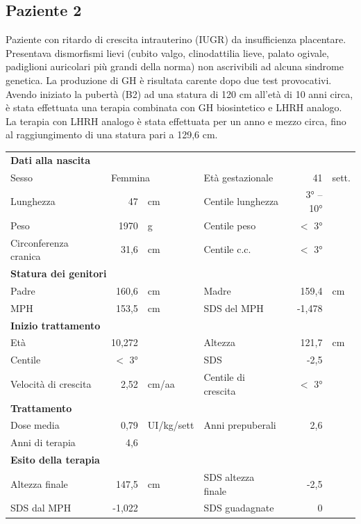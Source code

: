 \subsection*{Paziente 2}%

Paziente con ritardo di crescita intrauterino (IUGR) da insufficienza placentare.
Presentava dismorfismi lievi (cubito valgo, clinodattilia lieve, palato ogivale, padiglioni auricolari più grandi della norma) non ascrivibili ad alcuna sindrome genetica. La produzione di GH è risultata carente dopo due test provocativi. Avendo iniziato la pubertà (B2) ad una statura di 120 cm all'età di 10 anni circa, è stata effettuata una terapia combinata con GH biosintetico e LHRH analogo. La terapia con LHRH analogo è stata effettuata per un anno e mezzo circa, fino al raggiungimento di una statura pari a 129,6 cm.

\begin{table}[!h]
\begin{tabular}{lrllrl}
\toprule
\multicolumn{6}{l}{\textbf{Dati alla nascita}}\\
Sesso 		& \multicolumn{2}{l}{Femmina} 	& Età gestazionale 		& 41 		& sett.\\
Lunghezza 	& 47 		& cm 				& Centile lunghezza		& 3° -- 10°	\\
Peso 		& 1970 		& g					& Centile peso			& $<$ 3° 		\\
Circonferenza cranica	& 31,6 		& cm 	& Centile c.c.			& $<$ 3° \\
\midrule
\multicolumn{6}{l}{\textbf{Statura dei genitori}}\\
Padre 		& 160,6 & cm 	& Madre 				& 159,4 & cm \\
MPH 		& 153,5 & cm 	& SDS del MPH 			& -1,478\\
\midrule
\multicolumn{6}{l}{\textbf{Inizio trattamento}} \\
Età	& 10,272 & 		& Altezza 				& 121,7 & cm  \\
Centile & $<$ 3° 	 &		& SDS		& -2,5 \\
Velocità di crescita & 2,52 & cm/aa	& Centile di crescita & $<$ 3°\\
\midrule
\multicolumn{6}{l}{\textbf{Trattamento}} \\
Dose media		& 0,79 & UI/kg/sett & Anni prepuberali & 2,6\\
Anni di terapia & 4,6\\
\midrule
\multicolumn{6}{l}{\textbf{Esito della terapia}} \\
Altezza finale			& 147,5 & cm 	& SDS altezza finale & -2,5\\
SDS dal MPH	& -1,022 	& 	& SDS guadagnate 			& 0\\
\bottomrule
\end{tabular}
\end{table}




